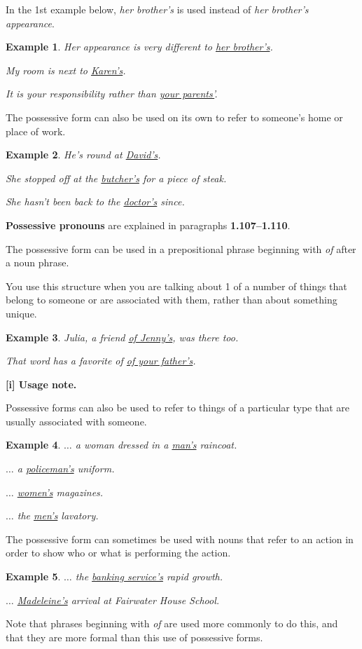 \documentclass[oneside]{book}
\numberwithin{equation}{section}
\newtheorem{example}{Example}[section]
\begin{document}
In the 1st example below, \textit{her brother's} is used instead of \textit{her brother's appearance}.
\begin{example}
    Her appearance is very different to \underline{her brother's}.
    
    My room is next to \underline{Karen's}.
    
    It is your responsibility rather than \underline{your parents'}.
\end{example}
The possessive form can also be used on its own to refer to someone's home or place of work.
\begin{example}
    He's round at \underline{David's}.
    
    She stopped off at the \underline{butcher's} for a piece of steak.
    
    She hasn't been back to the \underline{doctor's} since.
\end{example}
\textbf{Possessive pronouns} are explained in paragraphs \textbf{1.107--1.110}.

%
\noindent{} The possessive form can be used in a prepositional phrase beginning with \textit{of} after a noun phrase.

You use this structure when you are talking about 1 of a number of things that belong to someone or are associated with them, rather than about something unique.
\begin{example}
    Julia, a friend \underline{of Jenny's}, was there too.
    
    That word has a favorite of \underline{of your father's}.
\end{example}
%
\textbf{[i] Usage note.}

%
\noindent{} Possessive forms can also be used to refer to things of a particular type that are usually associated with someone.
\begin{example}
    $\ldots$ a woman dressed in a \underline{man's} raincoat.
    
    $\ldots$ a \underline{policeman's} uniform.
    
    $\ldots$ \underline{women's} magazines.
    
    $\ldots$ the \underline{men's} lavatory.
\end{example}
%
\noindent{} The possessive form can sometimes be used with nouns that refer to an action in order to show who or what is performing the action.
\begin{example}
    $\ldots$ the \underline{banking service's} rapid growth.
    
    $\ldots$ \underline{Madeleine's} arrival at Fairwater House School.
\end{example}
Note that phrases beginning with \textit{of} are used more commonly to do this, and that they are more formal than this use of possessive forms.
\end{document}
